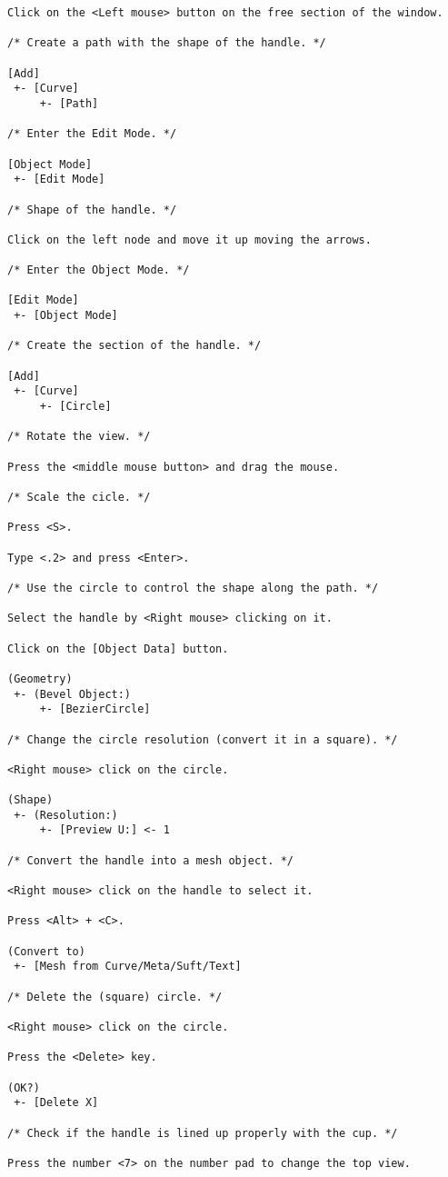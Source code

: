 \begin{verbatim}
Click on the <Left mouse> button on the free section of the window.

/* Create a path with the shape of the handle. */

[Add]
 +- [Curve]
     +- [Path]

/* Enter the Edit Mode. */

[Object Mode]
 +- [Edit Mode]

/* Shape of the handle. */

Click on the left node and move it up moving the arrows. 

/* Enter the Object Mode. */

[Edit Mode]
 +- [Object Mode]

/* Create the section of the handle. */

[Add]
 +- [Curve]
     +- [Circle]

/* Rotate the view. */

Press the <middle mouse button> and drag the mouse.

/* Scale the cicle. */

Press <S>.

Type <.2> and press <Enter>.

/* Use the circle to control the shape along the path. */

Select the handle by <Right mouse> clicking on it.

Click on the [Object Data] button.

(Geometry)
 +- (Bevel Object:)
     +- [BezierCircle]

/* Change the circle resolution (convert it in a square). */

<Right mouse> click on the circle.

(Shape)
 +- (Resolution:)
     +- [Preview U:] <- 1

/* Convert the handle into a mesh object. */

<Right mouse> click on the handle to select it.

Press <Alt> + <C>.

(Convert to)
 +- [Mesh from Curve/Meta/Suft/Text]

/* Delete the (square) circle. */

<Right mouse> click on the circle.

Press the <Delete> key.

(OK?)
 +- [Delete X]

/* Check if the handle is lined up properly with the cup. */

Press the number <7> on the number pad to change the top view.


\end{verbatim}
